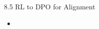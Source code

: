 \begin{frame}{8.5 RL to DPO for Alignment}
    \begin{itemize}
        \item
    \end{itemize}
\end{frame}
